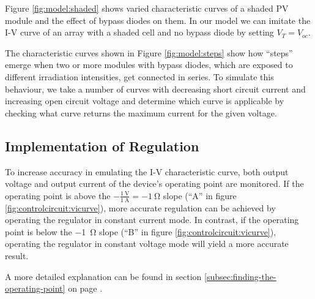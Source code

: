 Figure \ref{fig:model:shaded}  shows varied characteristic curves  of a shaded
PV  module and  the effect  of bypass  diodes on  them.  In  our model  we can
imitate the I-V  curve of an array with  a shaded cell and no  bypass diode by
setting $V_T = V_{oc}$.


The  characteristic  curves  shown  in  Figure  \ref{fig:model:steps}  show  how
``steps'' emerge when two or more modules  with bypass diodes, which are exposed
to different irradiation intensities, get  connected in series. To simulate this
behaviour, we take  a number of curves with decreasing short circuit current and
increasing  open  circuit  voltage  and  determine  which curve is applicable by
checking  what  curve  returns  the  maximum  current  for  the  given  voltage.



\subsection{Implementation of Regulation}
\label{subsec:regimplementation}

To increase  accuracy in emulating  the I-V characteristic curve,  both output
voltage and output current of the  device's operating point are monitored.  If
the  operating  point  is  above  the  $-\frac{\SI{1}{\volt}}{\SI{1}{\ampere}}
=  \SI{-1}{\ohm}$ slope  (``A''  in figure  \ref{fig:controlcircuit:vicurve}),
more  accurate  regulation can  be  achieved  by  operating the  regulator  in
constant  current  mode.   In  contrast,  if  the  operating  point  is  below
the  \SI{-1}{\ohm} slope  (``B'' in  figure \ref{fig:controlcircuit:vicurve}),
operating the  regulator in constant voltage  mode will yield a  more accurate
result.

A       more        detailed       explanation       can        be       found
in      section      \ref{subsec:finding-the-operating-point}     on      page
\pageref{subsec:finding-the-operating-point}.

